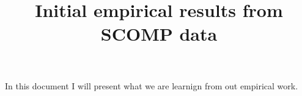 \documentclass[12pt]{article}
\begin{document}
\title{Initial empirical results from SCOMP data}

\maketitle

In this document I will present what we are learnign from out empirical work. 
\end{document}
